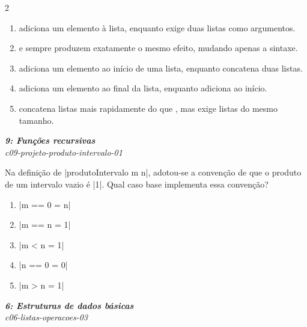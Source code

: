 \documentclass[a4paper,10pt,brazil]{article}
\begin{document}
\begin{multicols}{2}
\begin{enumerate}
  \item \haskellinline{(++)} adiciona um elemento à lista, enquanto \haskellinline{(:)} exige duas listas como argumentos.

  \item \haskellinline{(:)} e \haskellinline{(++)} sempre produzem exatamente o mesmo efeito, mudando apenas a sintaxe.

  \item \haskellinline{(:)} adiciona um elemento ao início de uma lista, enquanto \haskellinline{(++)} concatena duas listas.

  \item \haskellinline{(:)} adiciona um elemento ao final da lista, enquanto \haskellinline{(++)} adiciona ao início.

  \item \haskellinline{(:)} concatena listas mais rapidamente do que \haskellinline{(++)}, mas exige listas do mesmo tamanho.


\end{enumerate}

\begin{flushright}
  \footnotesize
  \textit{\textbf{9: Funções recursivas}}\\
  \textit{c09-projeto-produto-intervalo-01}\\

\end{flushright}
Na definição de \haskellinline|produtoIntervalo m n|, adotou-se a convenção de que o produto de um intervalo vazio é \haskellinline|1|. Qual caso base implementa essa convenção?

\begin{enumerate}
  \item \haskellinline|m == 0 = n|

  \item \haskellinline|m == n = 1|

  \item \haskellinline|m < n = 1|

  \item \haskellinline|n == 0 = 0|

  \item \haskellinline|m > n = 1|


\end{enumerate}

\begin{flushright}
  \footnotesize
  \textit{\textbf{6: Estruturas de dados básicas}}\\
  \textit{c06-listas-operacoes-03}\\


\end{flushright}
\end{multicols}
\end{document}
